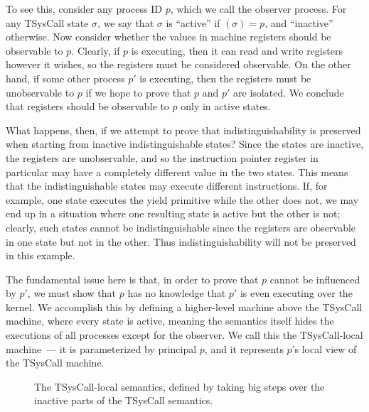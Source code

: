 To see this, consider any process ID $p$, which we
call the observer process. For any TSysCall state $\sigma$, we say
that $\sigma$ is ``active'' if $(\sigma) = p$, and
``inactive'' otherwise. Now consider whether the values in machine
registers should be observable to $p$. Clearly, if $p$ is executing,
then it can read and write registers however it wishes, so the
registers must be considered observable.  On the other hand, if some
other process $p'$ is executing, then the registers must be
unobservable to $p$ if we hope to prove that $p$ and $p'$ are
isolated. We conclude that registers should be observable to $p$ only
in active states.

What happens, then, if we attempt to prove that 
indistinguishability is preserved when starting from
inactive indistinguishable states? Since the states 
are inactive, the registers are unobservable, and so
the instruction pointer register in particular may have
a completely different value in the two states. This means
that the indistinguishable states may execute different
instructions. If, for example, one state executes the yield primitive
while the other does not, we may end up in a situation
where one resulting state is active but the other is not;
clearly, such states cannot be indistinguishable 
since the registers are observable in one state but not
in the other. Thus indistinguishability will not
be preserved in this example.

The fundamental issue here is that, in order to prove
that $p$ cannot be influenced by $p'$, we must show
that $p$ has no knowledge that $p'$ is even executing
over the kernel. We accomplish this by defining a
higher-level machine above the TSysCall machine, where every state 
is active, meaning the semantics itself hides the executions
of all processes except for the observer. We call this the TSysCall-local 
machine~--- it is parameterized by principal $p$, and it 
represents $p$'s local view of the TSysCall machine.

\begin{figure}
\caption{\small{The TSysCall-local semantics, defined
by taking big steps over the inactive parts of the TSysCall 
semantics.}}
\label{bigstep}
\end{figure}

